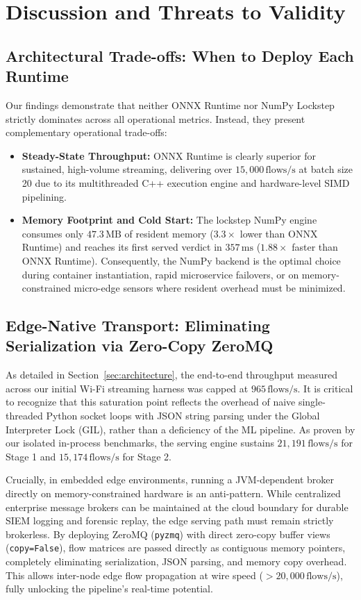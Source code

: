 \section{Discussion and Threats to Validity}
\label{sec:discussion}

\subsection{Architectural Trade-offs: When to Deploy Each Runtime}
Our findings demonstrate that neither ONNX Runtime nor NumPy Lockstep strictly dominates across all operational metrics. Instead, they present complementary operational trade-offs:
\begin{itemize}
    \item \textbf{Steady-State Throughput:} ONNX Runtime is clearly superior for sustained, high-volume streaming, delivering over $15{,}000\,\text{flows/s}$ at batch size 20 due to its multithreaded C++ execution engine and hardware-level SIMD pipelining.
    \item \textbf{Memory Footprint and Cold Start:} The lockstep NumPy engine consumes only $47.3\,\text{MB}$ of resident memory ($3.3\times$ lower than ONNX Runtime) and reaches its first served verdict in $357\,\text{ms}$ ($1.88\times$ faster than ONNX Runtime). Consequently, the NumPy backend is the optimal choice during container instantiation, rapid microservice failovers, or on memory-constrained micro-edge sensors where resident overhead must be minimized.
\end{itemize}

\subsection{Edge-Native Transport: Eliminating Serialization via Zero-Copy ZeroMQ}
As detailed in Section~\ref{sec:architecture}, the end-to-end throughput measured across our initial Wi-Fi streaming harness was capped at $965\,\text{flows/s}$. It is critical to recognize that this saturation point reflects the overhead of naive single-threaded Python socket loops with JSON string parsing under the Global Interpreter Lock (GIL), rather than a deficiency of the ML pipeline. As proven by our isolated in-process benchmarks, the serving engine sustains $21{,}191\,\text{flows/s}$ for Stage 1 and $15{,}174\,\text{flows/s}$ for Stage 2. 

Crucially, in embedded edge environments, running a JVM-dependent broker directly on memory-constrained hardware is an anti-pattern. While centralized enterprise message brokers can be maintained at the cloud boundary for durable SIEM logging and forensic replay, the edge serving path must remain strictly brokerless. By deploying ZeroMQ (\texttt{pyzmq}) with direct zero-copy buffer views (\texttt{copy=False}), flow matrices are passed directly as contiguous memory pointers, completely eliminating serialization, JSON parsing, and memory copy overhead. This allows inter-node edge flow propagation at wire speed ($>20{,}000\,\text{flows/s}$), fully unlocking the pipeline's real-time potential.

